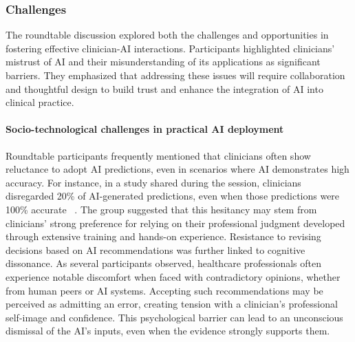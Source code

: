 


\subsubsection{Challenges} 
The roundtable discussion explored both the challenges and opportunities in fostering effective clinician-AI interactions. Participants highlighted clinicians' mistrust of AI and their misunderstanding of its applications as significant barriers. They emphasized that addressing these issues will require collaboration and thoughtful design to build trust and enhance the integration of AI into clinical practice.

\paragraph{Socio-technological challenges in practical AI deployment} 
Roundtable participants frequently mentioned that clinicians often show reluctance to adopt AI predictions, even in scenarios where AI demonstrates high accuracy. 
For instance, in a study shared during the session, clinicians disregarded 20\% of AI-generated predictions, even when those predictions were 100\% accurate ~\citep{10.1001/jama.2023.22295}. 
The group suggested that this hesitancy may stem from clinicians' strong preference for relying on their professional judgment developed through extensive training and hands-on experience. 
Resistance to revising decisions based on AI recommendations was further linked to cognitive dissonance. 
As several participants observed, healthcare professionals often experience notable discomfort when faced with contradictory opinions, whether from human peers or AI systems. 
Accepting such recommendations may be perceived as admitting an error, creating tension with a clinician's professional self-image and confidence. 
This psychological barrier can lead to an unconscious dismissal of the AI's inputs, even when the evidence strongly supports them.

